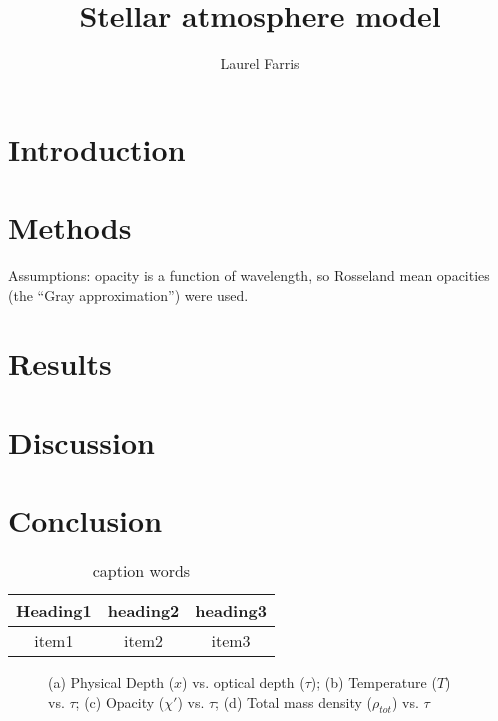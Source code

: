 \documentclass[preprint]{aastex}
\begin{document}
\title{Stellar atmosphere model}
\author{Laurel Farris}

\begin{abstract}
\end{abstract}

\section{Introduction}\label{intro}

\section{Methods}
Assumptions: opacity is a function of wavelength, so Rosseland mean
opacities (the ``Gray approximation'') were used.

\section{Results}
\section{Discussion}
\section{Conclusion}


\begin{table}[h]
    \centering
    \begin{tabular}{c c c}
        \hline\hline
        Heading1 & heading2 & heading3 \\
        \hline
        item1 & item2 & item3 \\
    \end{tabular}
    \caption{caption words}
    \label{labelname}
\end{table}

\begin{figure}[htb!]  %
    \caption{(a) Physical Depth ($x$) vs. optical depth ($\tau$);
        (b) Temperature ($T$) vs. $\tau$;
        (c) Opacity ($\chi'$) vs. $\tau$;
        (d) Total mass density ($\rho_{tot}$) vs. $\tau$ }
\end{figure}
\end{document}

